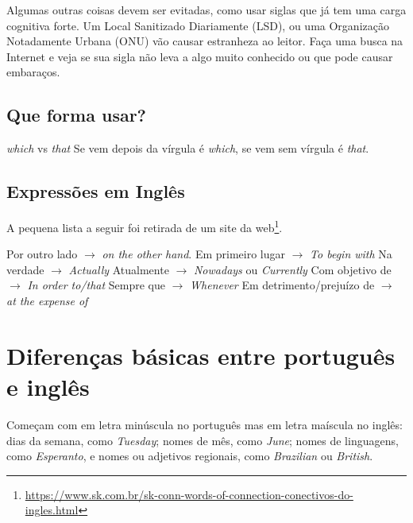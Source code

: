 \documentclass[openany]{book}
\begin{document}
Algumas outras coisas devem ser evitadas, como usar siglas que já tem uma carga cognitiva forte. Um Local Sanitizado Diariamente (LSD), ou uma Organização Notadamente Urbana (ONU) vão causar estranheza ao leitor. Faça uma busca na Internet e veja se sua sigla não leva a algo muito conhecido ou que pode causar embaraços.


\subsection{Que forma usar?}

\begin{outline}
\1 \textit{which} vs \textit{that}
\2 Se vem depois da vírgula é \textit{which}, se vem sem vírgula é \textit{that}.
\end{outline}

\subsection{Expressões em Inglês}

 A pequena lista a seguir foi retirada de um site da web\footnote{\url{https://www.sk.com.br/sk-conn-words-of-connection-conectivos-do-ingles.html}}.

\begin{outline}
    \1 Por outro lado $\rightarrow$ \textit{on the other hand}.
    \1 Em primeiro lugar $\rightarrow$ \textit{To begin with}
    \1 Na verdade    $\rightarrow$ \textit{Actually}
    \1 Atualmente    $\rightarrow$ \textit{Nowadays} ou \textit{Currently}
    \1 Com objetivo de $\rightarrow$ \textit{In order to/that}
    \1 Sempre que $\rightarrow$ \textit{Whenever}
    \1 Em detrimento/prejuízo de $\rightarrow$ \textit{at the expense of}
\end{outline}


\section{Diferenças básicas entre português e inglês}

\begin{outline}
    \1 Começam com em letra minúscula no português mas em letra maíscula no inglês:
    \2 dias da semana, como \textit{Tuesday};
    \2 nomes de mês, como \textit{June};
    \2 nomes de linguagens, como \textit{Esperanto}, e
    \2 nomes ou adjetivos regionais, como \textit{Brazilian} ou \textit{British}.
\end{outline}
\end{document}
